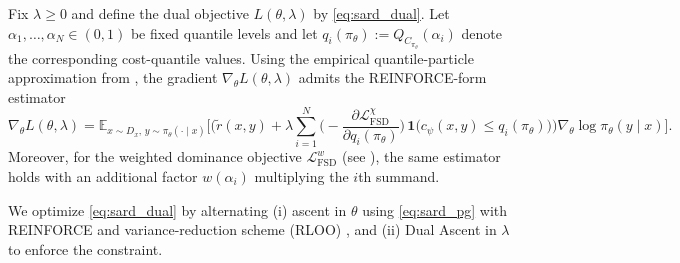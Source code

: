 \begin{theorem}\label{thm:sard_pg}
  Fix $\lambda\ge 0$ and define the dual objective $L(\theta,\lambda)$ by \eqref{eq:sard_dual}.
  Let $\alpha_1,\dots,\alpha_N\in(0,1)$ be fixed quantile levels and let
  $q_i(\pi_\theta):=Q_{C_{\pi_\theta}}(\alpha_i)$ denote the corresponding cost-quantile values. Using the empirical quantile-particle approximation from ,
  the gradient $\nabla_\theta L(\theta,\lambda)$ admits the REINFORCE-form estimator
  \begin{equation}
    \nabla_\theta L(\theta,\lambda)
    =
    \mathbb{E}_{x\sim D_x,\,y\sim\pi_\theta(\cdot\mid x)}
    \Bigg[
      \Bigg(\tilde r(x,y)+\lambda\sum_{i=1}^N
        \Big(-\frac{\partial \mathcal{L}^{\chi}_{\mathrm{FSD}}}{\partial q_i(\pi_\theta)}\Big)\,
        \mathbf{1}\!\big(c_\psi(x,y)\le q_i(\pi_\theta)\big)
      \Bigg)
      \nabla_\theta\log\pi_\theta(y\mid x)
    \Bigg]. \label{eq:sard_pg}
  \end{equation}
  Moreover, for the weighted dominance objective $\mathcal{L}^{w}_{\mathrm{FSD}}$ (see ),
  the same estimator holds with an additional factor $w(\alpha_i)$ multiplying the $i$th summand. %
\end{theorem}
We optimize \eqref{eq:sard_dual} by alternating (i) ascent in $\theta$ using \eqref{eq:sard_pg} with REINFORCE \citep{williams1992simple} and variance-reduction scheme (RLOO) \citep{Kool2019Buy4R}, and (ii) Dual Ascent \citep{gallier2019fundamentals} in $\lambda$ to enforce the constraint.



